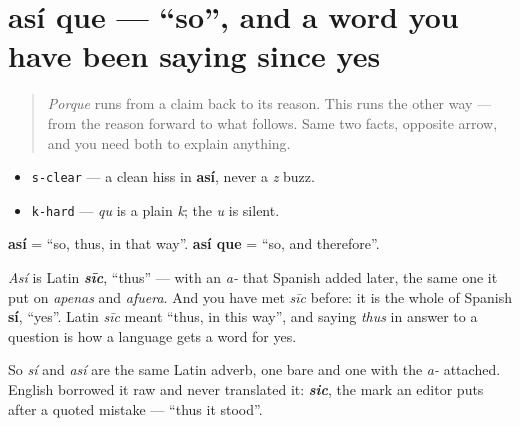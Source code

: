 \section[así que]{así que — \textquotedblleft{}so\textquotedblright{}, and a word you have been saying since yes}

\label{lesson:ES-C41-asi-que}



\begin{quote}
\emph{Porque} runs from a claim back to its reason. This runs the other way — from the reason forward to what follows. Same two facts, opposite arrow, and you need both to explain anything.
\end{quote}

\begin{sounds}
\begin{itemize}
\raggedright
  \item \texttt{s-clear} — a clean hiss in \textbf{así}, never a \emph{z} buzz.
  \item \texttt{k-hard} — \emph{qu} is a plain \emph{k}; the \emph{u} is silent.
\end{itemize}
\end{sounds}

\begin{cousinweb}
\textbf{así} = \textquotedblleft{}so, thus, in that way\textquotedblright{}. \textbf{así que} = \textquotedblleft{}so, and therefore\textquotedblright{}.

\emph{Así} is Latin \emph{\textbf{sīc}}, \textquotedblleft{}thus\textquotedblright{} — with an \emph{a-} that Spanish added later, the same one it put on \emph{apenas} and \emph{afuera}. And you have met \emph{sīc} before: it is the whole of Spanish \textbf{sí}, \textquotedblleft{}yes\textquotedblright{}. Latin \emph{sīc} meant \textquotedblleft{}thus, in this way\textquotedblright{}, and saying \emph{thus} in answer to a question is how a language gets a word for yes.

So \emph{sí} and \emph{así} are the same Latin adverb, one bare and one with the \emph{a-} attached. English borrowed it raw and never translated it: \emph{\textbf{sic}}, the mark an editor puts after a quoted mistake — \textquotedblleft{}thus it stood\textquotedblright{}.
\end{cousinweb}

